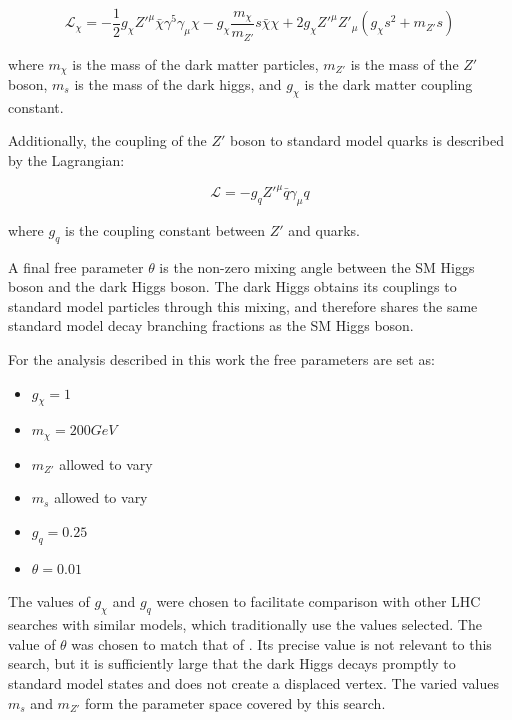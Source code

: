\begin{equation}
\mathcal{L}_{\chi} = -\frac{1}{2}g_{\chi}Z'^{\mu}\bar{\chi}\gamma^5\gamma_{\mu}\chi - g_{\chi}\frac{m_{\chi}}{m_{Z'}}s\bar{\chi}\chi + 2g_{\chi}Z'^{\mu}Z'_{\mu}(g_{\chi}s^2 + m_{Z'}s)
\end{equation}

where $m_{\chi}$ is the mass of the dark matter particles, $m_{Z'}$ is the mass of the $Z'$ boson, $m_{s}$ is the mass of the dark higgs, and $g_{\chi}$ is the dark matter coupling constant.

Additionally, the coupling of the $Z'$ boson to standard model quarks is described by the Lagrangian:

\begin{equation}
\mathcal{L} = -g_qZ'^{\mu}\bar{q}\gamma_{\mu}q
\end{equation}

where $g_q$ is the coupling constant between $Z'$ and quarks.

A final free parameter $\theta$ is the non-zero mixing angle between the SM Higgs boson and the dark Higgs boson. The dark Higgs obtains its couplings to standard model particles through this mixing, and therefore shares the same standard model decay branching fractions as the SM Higgs boson.

For the analysis described in this work the free parameters are set as:

\begin{itemize}
    \item $g_{\chi} = 1$
    \item $m_{\chi} = 200 GeV$
    \item $m_{Z'}$ allowed to vary
    \item $m_s$ allowed to vary
    \item $g_q = 0.25$
    \item $\theta = 0.01$ 
\end{itemize}

The values of $g_{\chi}$ and $g_{q}$ were chosen to facilitate comparison with other LHC searches with similar models, which traditionally use the values selected. The value of $\theta$ was chosen to match that of \cite{Hunting}. Its precise value is not relevant to this search, but it is sufficiently large that the dark Higgs decays promptly to standard model states and does not create a displaced vertex. The varied values $m_s$ and $m_{Z'}$ form the parameter space covered by this search. 
